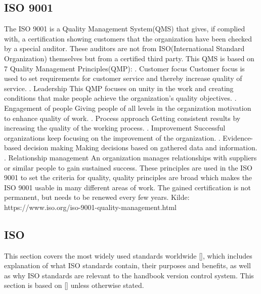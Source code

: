 \subsection{ISO 9001}
The ISO 9001 is a Quality Management System(QMS) that gives, if complied with, a certification showing customers that the organization have been checked by a special auditor. These auditors are not from ISO(International Standard Organization) themselves but from a certified third party.
This QMS is based on 7 Quality Management Principles(QMP):
. Customer focus
\newline
Customer focus is used to set requirements for customer service and thereby increase quality of service.
. Leadership
\newline
This QMP focuses on unity in the work and creating conditions that make people achieve the organization's quality objectives.
. Engagement of people
\newline
Giving people of all levels in the organization motivation to enhance quality of work.
. Process approach
\newline
Getting consistent results by increasing the quality of the working process.
. Improvement
\newline
Successful organizations keep focusing on the improvement of the organization.
. Evidence-based decision making
\newline
Making decisions based on gathered data and information.
. Relationship management
\newline
An organization manages relationships with suppliers or similar people to gain sustained success.
\newline
These principles are used in the ISO 9001 to set the criteria for quality,
quality principles are broad which makes the ISO 9001 usable in many different areas of work.
The gained certification is not permanent, but needs to be renewed every few years.
\newline
Kilde: https://www.iso.org/iso-9001-quality-management.html	 	 	
\newline
\subsection{ISO}
This section covers the most widely used standards worldwide [], which includes explanation of what ISO standards contain, their purposes and benefits, as well as why ISO standards are relevant to the handbook version control system. This section is based on [] unless otherwise stated.

